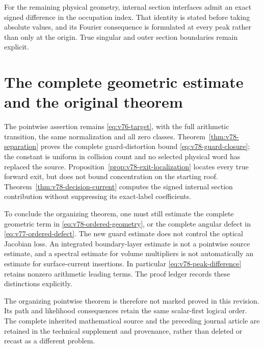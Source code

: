 \documentclass[11pt,reqno]{amsart}
\numberwithin{equation}{section}
\theoremstyle{definition}
\theoremstyle{remark}\newtheorem{remark}[theorem]{Remark}
\begin{document}
For the remaining physical geometry, internal section interfaces
admit an exact signed difference in the occupation index. That
identity is stated before taking absolute values, and its Fourier
consequence is formulated at every peak rather than only at the
origin. True singular and outer section boundaries remain explicit.









\section{The complete geometric estimate and the original theorem}
The pointwise assertion remains \eqref{eq:v76-target}, with the full
arithmetic transition, the same normalization and all zero classes.
Theorem~\ref{thm:v78-separation} proves the complete guard-distortion
bound \eqref{eq:v78-guard-closure}; the constant is uniform in collision
count and no selected physical word has replaced the source.
Proposition~\ref{prop:v78-exit-localization} locates every true forward
exit, but does not bound concentration on the starting roof.
Theorem~\ref{thm:v78-decision-current} computes the signed internal
section contribution without suppressing its exact-label coefficients.

To conclude the organizing theorem, one must still estimate the
complete geometric term in \eqref{eq:v78-ordered-geometry}, or the
complete angular defect in \eqref{eq:v77-ordered-defect}. The new
guard estimate does not control the optical Jacobian loss. An
integrated boundary-layer estimate is not a pointwise source estimate,
and a spectral estimate for volume multipliers is not automatically
an estimate for surface-current insertions. In particular
\eqref{eq:v78-peak-difference} retains nonzero arithmetic leading
terms. The proof ledger records these distinctions explicitly.

The organizing pointwise theorem is therefore not marked proved in
this revision. Its path and likelihood consequences retain the same
scalar-first logical order. The complete inherited mathematical
source and the preceding journal article are retained in the technical
supplement and provenance, rather than deleted or recast as a different
problem.


\end{document}
